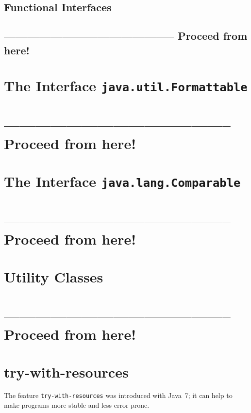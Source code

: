 \documentclass[11pt,a4paper, titlepage, parskip=half, headsepline, footsepline, cleardoublepage=current, headheight=1cm]{scrbook}
\begin{document}
\subsection{Functional Interfaces}\label{sec:FunctionalInterfaces}
\subsection{-------------------------------------------- Proceed from here!}
\lipsum[5]

\section{The Interface \lstinline|java.util.Formattable|}\label{sec:FormattableInterface}
\section{-------------------------------------------- Proceed from here!}

\autocite{ORACLE_DOC_STRING_CLASS}
\autocite{ORACLE_DOC_STRINGBUFFER_CLASS}
\autocite{ORACLE_DOC_STRINGBUILDER_CLASS}
\autocite{ORACLE_DOC_STRINGJOINER_CLASS}
\autocite{ORACLE_DOC_FORMATTER_CLASS}
\autocite{ORACLE_DOC_FORMATTABLE_INTERFACE}

\lipsum[1]

\section{The Interface \lstinline|java.lang.Comparable|}\label{sec:ComparableInterface}
\section{-------------------------------------------- Proceed from here!}
\lipsum[5]

\section{Utility Classes}\label{sec:UtilityClasses}
\section{-------------------------------------------- Proceed from here!}
\lipsum[5]

\section{try-with-resources}\label{sec:TryWithResources}
The feature \lstinline|try-with-resources| was introduced with Java~7; it can help to make programs more stable and less error prone.
\end{document}
